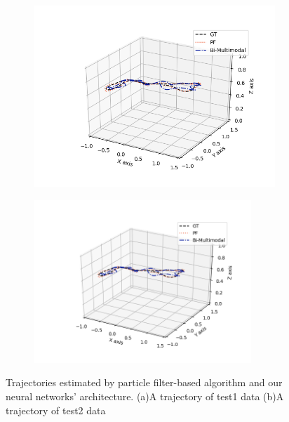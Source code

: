 \documentclass[letterpaper, 10 pt, conference]{ieeeconf}  %
\begin{document}
 
 \begin{figure}[h]
 	\centering
 	\begin{subfigure}[b]{.50\textwidth}
 		\centering
 		\includegraphics[width=.9\textwidth]{PF_multimodal_comparison2}
 		\label{fig:trajectory1} 	
 		\caption{}
 	\end{subfigure}%
 	\begin{subfigure}[b]{.50\textwidth}
 		\centering
 		\includegraphics[width=0.9\textwidth]{PF_multimodal_comparison2}
 		\label{fig:trajectory2} 	
 		\caption{}
 	\end{subfigure}
 	\caption{Trajectories estimated by particle filter-based algorithm and our neural networks' architecture. (a)A trajectory of test1 data (b)A trajectory of test2 data}
 	\label{fig:trajectory}
 \end{figure} 
 
\end{document}
